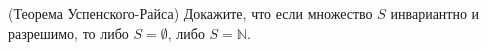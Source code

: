 (Теорема Успенского-Райса) Докажите, что если множество $S$ инвариантно и разрешимо, то либо $S = \emptyset$, либо $S = \mathbb{N}$.